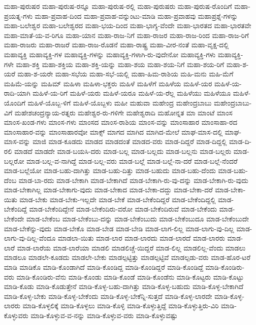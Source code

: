 {ಮಹಾ-ಪುರುಷರ
ಮಹಾ-ಪುರುಷ-ರನ್ನೂ
ಮಹಾ-ಪುರುಷ-ರಲ್ಲಿ
ಮಹಾ-ಪುರುಷರು
ಮಹಾ-ಪುರುಷ-ರೊಂದಿಗೆ
ಮಹಾ-ಪ್ರಯತ್ನ-ಗಳು
ಮಹಾ-ಪ್ರವಾಹ-ದಿಂದ
ಮಹಾ-ಪ್ರವಾಹ-ವನ್ನುಂಟು-ಮಾಡಿ
ಮಹಾ-ಪ್ರವಾಹವು
ಮಹಾಪ್ರಶ್ನೆ-ಗಳನ್ನು
ಮಹಾ-ಬಲೇಶ್ವರ
ಮಹಾ-ಬಲೇಶ್ವರದ
ಮಹಾ-ಭಯ-ದಿಂದ
ಮಹಾ-ಭಾಗ್ಯ-ವೆಂದೇ
ಮಹಾ-ಭಾರತದ
ಮಹಾ-ಭಾರತವೇ
ಮಹಾ-ಮಾತೆ-ಯ-ವ-ರಿಗೂ
ಮಹಾ-ಯಾನ
ಮಹಾ-ರಾಜ-ನಿಗೆ
ಮಹಾ-ರಾಜರ
ಮಹಾ-ರಾಜ-ರಿಂದ
ಮಹಾ-ರಾಜ-ರಿಗೆ
ಮಹಾ-ರಾಜರು
ಮಹಾ-ರಾಜರೆ
ಮಹಾ-ರಾಜ-ರೊಡನೆ
ಮಹಾ-ರಾಷ್ಟ್ರ
ಮಹಾ-ವೀರ-ನಂತೆ
ಮಹಾ-ವೃಕ್ಷ-ದಲ್ಲಿ
ಮಹಾವ್ಯಕ್ತಿ
ಮಹಾವ್ಯಕ್ತಿ-ಗಳ
ಮಹಾವ್ಯಕ್ತಿ-ಗಳನ್ನು
ಮಹಾವ್ಯಕ್ತಿ-ಗಳಾಗಿ-ರು-ವುದೇನೋ
ಮಹಾವ್ಯಕ್ತಿ-ಗಳು
ಮಹಾವ್ಯಕ್ತಿ-ಗಳೇ
ಮಹಾ-ಶಕ್ತಿ
ಮಹಾ-ಶಕ್ತಿಯ
ಮಹಾ-ಶಕ್ತಿ-ಯನ್ನು
ಮಹಾ-ಶಯ
ಮಹಾ-ಶಯ-ನಿಗೆ
ಮಹಾ-ಶಯ-ರಿಗೆ
ಮಹಾ-ಶ-ಯರೆ
ಮಹಾ-ಶ-ಯರೇ
ಮಹಾ-ಸಭೆಯ
ಮಹಾ-ಸಭೆ-ಯಲ್ಲಿ
ಮಹಾ-ಹಿಮ-ರಾಶಿಯ
ಮಹಿ-ಮನು
ಮಹಿ-ಮೆಗೆ
ಮಹಿಮೆ-ಯನ್ನು
ಮಹಿಮ್
ಮಹಿಳಾ
ಮಹಿಳಾ-ಭಕ್ತರು
ಮಹಿಳೆ
ಮಹಿಳೆಗೆ
ಮಹಿಳೆಯ
ಮಹಿಳೆ-ಯರ
ಮಹಿಳೆ-ಯ-ರಾದಿ-ಯಾಗಿ
ಮಹಿಳೆ-ಯ-ರಿಗೆ
ಮಹಿಳೆ-ಯರು
ಮಹಿಳೆ-ಯರೂ
ಮಹಿಳೆ-ಯ-ರೆಲ್ಲ
ಮಹಿಳೆಯು
ಮಹಿಳೆಯೂ
ಮಹಿಳೆ-ಯೊಂದಿಗೆ
ಮಹಿಳೆ-ಯೊಬ್ಬ-ಳಿಗೆ
ಮಹಿಳೆ-ಯೊಬ್ಬಳು
ಮಹೀ
ಮಹುವಾ
ಮಹೇಂದ್ರ
ಮಹೇಂದ್ರಬಾಬು
ಮಹೇಂದ್ರಬಾಬು-ವಿಗೆ
ಮಹೇಶಚಂದ್ರನ್ಯಾಯ-ರತ್ನರು
ಮಹೇಶ್ವರ-ರು-ಗಳಿಗೇ
ಮಹೇಶ್ವರಾದಿ
ಮಹೋನ್ನತ
ಮಾ
ಮಾಂಟೆ
ಮಾಂಸ
ಮಾಂಸ-ಖಂಡ-ಗಳು
ಮಾಂಸ-ಗಳು
ಮಾಂಸದ
ಮಾಂಸ-ರಾಶಿಯ
ಮಾಂಸ-ವನ್ನು
ಮಾಂಸಾಹಾರ
ಮಾಂಸಾಹಾ-ರದ
ಮಾಂಸಾಹಾರ-ವನ್ನು
ಮಾಂಸಾಹಾರವೋ
ಮಾಕ್ಸ್
ಮಾಗದ
ಮಾಗಿದ
ಮಾಗಿದ-ಮೇಲೆ
ಮಾಘ-ಮಾಸ-ದಲ್ಲಿ
ಮಾಘ-ಮಾಸ-ವನ್ನು
ಮಾಜಿ
ಮಾಡ-ಕೂಡದು
ಮಾಡದ
ಮಾಡದಂತೆ
ಮಾಡದ-ವರು
ಮಾಡ-ದಿದ್ದರೆ
ಮಾಡ-ದಿದ್ದಲ್ಲಿ
ಮಾಡ-ದಿ-ರಲಿ
ಮಾಡದೆ
ಮಾಡದೇ
ಮಾಡ-ಬಯಸಿ-ದರು
ಮಾಡ-ಬಲ್ಲ
ಮಾಡ-ಬಲ್ಲದು
ಮಾಡ-ಬಲ್ಲನು
ಮಾಡ-ಬಲ್ಲರು
ಮಾಡ-ಬಲ್ಲರೋ
ಮಾಡ-ಬಲ್ಲ-ವ-ನಾಗಿದ್ದೆ
ಮಾಡ-ಬಲ್ಲ-ವರು
ಮಾಡ-ಬಲ್ಲೆ
ಮಾಡ-ಬಲ್ಲೆ-ನಾ-ದರೆ
ಮಾಡ-ಬಲ್ಲೆ-ನೆಂದರೆ
ಮಾಡ-ಬಲ್ಲೆಯೋ
ಮಾಡ-ಬಹು-ದಾಗಿತ್ತು
ಮಾಡ-ಬಹು-ದಿತ್ತು
ಮಾಡ-ಬಹುದು
ಮಾಡ-ಬಹು-ದೆಂದು
ಮಾಡ-ಬಹು-ದೆಂಬ
ಮಾಡ-ಬಾ-ರದು
ಮಾಡ-ಬೇಕಾಗಿ
ಮಾಡ-ಬೇಕಾಗಿದೆ
ಮಾಡ-ಬೇಕಾಗಿ-ರು-ವು-ದನ್ನು
ಮಾಡ-ಬೇಕಾಗಿ-ರು-ವುದು
ಮಾಡ-ಬೇಕಾಗಿಲ್ಲ
ಮಾಡ-ಬೇಕಾಗು-ವುದು
ಮಾಡ-ಬೇಕಾದ
ಮಾಡ-ಬೇಕಾ-ದದ್ದು
ಮಾಡ-ಬೇಕಾ-ದರೆ
ಮಾಡ-ಬೇಕಾ-ಯಿತು
ಮಾಡ-ಬೇಕು
ಮಾಡ-ಬೇಕು-ಇಲ್ಲದೇ
ಮಾಡ-ಬೇಕೆ
ಮಾಡ-ಬೇಕೆಂದಿದ್ದರೆ
ಮಾಡ-ಬೇಕೆಂದಿದ್ದಲ್ಲಿ
ಮಾಡ-ಬೇಕೆಂದಿದ್ದೆ
ಮಾಡ-ಬೇಕೆಂದಿದ್ದೇನೆ
ಮಾಡ-ಬೇಕೆಂದಿರು-ವರೋ
ಮಾಡ-ಬೇಕೆಂದಿರುವೆ
ಮಾಡ-ಬೇಕೆಂದು
ಮಾಡ-ಬೇಕೆಂದೇ
ಮಾಡ-ಬೇಕೆಂಬ
ಮಾಡ-ಬೇಕೆಂಬು-ದನ್ನು
ಮಾಡ-ಬೇಕೆಂಬುದು
ಮಾಡ-ಬೇಕೆಂಬುದೂ
ಮಾಡ-ಬೇಕೆಂಬುದೇ
ಮಾಡ-ಬೇಕೆನ್ನು-ವುದು
ಮಾಡ-ಬೇಕೊ
ಮಾಡ-ಬೇಡ
ಮಾಡ-ಬೇಡಿ
ಮಾಡ-ಲಾಗ-ಲಿಲ್ಲ
ಮಾಡ-ಲಾಗು-ವು-ದಿಲ್ಲ
ಮಾಡ-ಲಾಗು-ವು-ದಿಲ್ಲ-ವೆಂದೂ
ಮಾಡಲಾ-ಯಿತು
ಮಾಡ-ಲಾರ
ಮಾಡ-ಲಾರದು
ಮಾಡ-ಲಾರದೆ
ಮಾಡ-ಲಾರರು
ಮಾಡ-ಲಾರೆ
ಮಾಡ-ಲಾರೆಯ
ಮಾಡ-ಲಾರೆಯಾ
ಮಾಡಲಿ
ಮಾಡಲಿಚ್ಚೆ-ಯಿದ್ದರೆ
ಮಾಡ-ಲಿಲ್ಲ
ಮಾಡಲಿಲ್ಲ-ವೆಂದು
ಮಾಡಲು
ಮಾಡಲೂ
ಮಾಡಲೇ-ಕೂಡದು
ಮಾಡಲೇ-ಬೇಕು
ಮಾಡಲ್ಪಟ್ಟಿತ್ತು
ಮಾಡಲ್ಪಟ್ಟಿವೆ
ಮಾಡಲ್ಪಡು-ವರು
ಮಾಡ-ಹೊರ-ಟರೆ
ಮಾಡಿ
ಮಾಡಿಕೊ
ಮಾಡಿ-ಕೊಂಡಾಗಿದೆ
ಮಾಡಿ-ಕೊಂಡಿದ್ದ
ಮಾಡಿ-ಕೊಂಡಿದ್ದರೆ
ಮಾಡಿ-ಕೊಂಡಿದ್ದೆ
ಮಾಡಿ-ಕೊಂಡಿರು-ವರು
ಮಾಡಿ-ಕೊಂಡಿರು-ವೆನು
ಮಾಡಿ-ಕೊಂಡು
ಮಾಡಿ-ಕೊಂಡೆ
ಮಾಡಿ-ಕೊಂಡೆನು
ಮಾಡಿ-ಕೊಟ್ಟರು
ಮಾಡಿ-ಕೊಟ್ಟು
ಮಾಡಿ-ಕೊಡು
ಮಾಡಿ-ಕೊಡುತ್ತೇನೆ
ಮಾಡಿ-ಕೊಳ್ಳ-ಬಹು-ದಾಗಿತ್ತು
ಮಾಡಿ-ಕೊಳ್ಳ-ಬಹುದು
ಮಾಡಿ-ಕೊಳ್ಳ-ಬೇಕಾಗಿದೆ
ಮಾಡಿ-ಕೊಳ್ಳ-ಬೇಕು
ಮಾಡಿ-ಕೊಳ್ಳ-ಬೇಕೆಂದು
ಮಾಡಿ-ಕೊಳ್ಳ-ಬೇಕೆನ್ನಿ-ಸುತ್ತದೆ
ಮಾಡಿ-ಕೊಳ್ಳ-ಲಾರದೇ
ಮಾಡಿ-ಕೊಳ್ಳ-ಲಾರರು
ಮಾಡಿ-ಕೊಳ್ಳಲಿಕ್ಕೆ
ಮಾಡಿ-ಕೊಳ್ಳಲು
ಮಾಡಿ-ಕೊಳ್ಳಿ
ಮಾಡಿ-ಕೊಳ್ಳುತ್ತಿದ್ದೆ
ಮಾಡಿ-ಕೊಳ್ಳುತ್ತಿರು-ವಿರಿ
ಮಾಡಿ-ಕೊಳ್ಳುವರು
ಮಾಡಿ-ಕೊಳ್ಳುವ-ವ-ನನ್ನು
ಮಾಡಿ-ಕೊಳ್ಳುವ-ವರು
ಮಾಡಿ-ಕೊಳ್ಳುವಷ್ಟು
}
